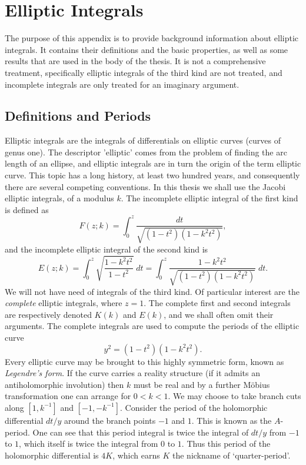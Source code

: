 
\section{Elliptic Integrals}
\label{sec:Elliptic Integrals}

The purpose of this appendix is to provide background information about elliptic integrals. It contains their definitions and the basic properties, as well as some results that are used in the body of the thesis. It is not a comprehensive treatment, specifically elliptic integrals of the third kind are not treated, and incomplete integrals are only treated for an imaginary argument.

\subsection{Definitions and Periods}
Elliptic integrals are the integrals of differentials on elliptic curves (curves of genus one). The descriptor 'elliptic' comes from the problem of finding the arc length of an ellipse, and elliptic integrals are in turn the origin of the term elliptic curve. This topic has a long history, at least two hundred years, and consequently there are several competing conventions. In this thesis we shall use the Jacobi elliptic integrals, of a modulus $k$. The incomplete elliptic integral of the first kind is defined as
\[
F(z;k) = \int_0^z \frac{dt}{\sqrt{(1-t^2)(1-k^2 t^2)}},
\]
and the incomplete elliptic integral of the second kind is
\[
E(z;k) = \int_0^z \sqrt{\frac{1-k^2 t^2}{1-t^2}} \;dt = \int_0^z \frac{1-k^2 t^2}{\sqrt{(1-t^2)(1-k^2 t^2)}}\;dt.
\]
We will not have need of integrals of the third kind. Of particular interest are the \emph{complete} elliptic integrals, where $z=1$. The complete first and second integrals are respectively denoted $K(k)$ and $E(k)$, and we shall often omit their arguments. The complete integrals are used to compute the periods of the elliptic curve
\[
y^2 = (1-t^2)(1-k^2 t^2).
\]
Every elliptic curve may be brought to this highly symmetric form, known as {\it Legendre's form}. If the curve carries a reality structure (if it admits an antiholomorphic involution) then $k$ must be real and by a further M\"obius transformation one can arrange for $0 < k < 1$. We may choose to take branch cuts along $[1,k^{-1}]$ and $[-1,-k^{-1}]$. Consider the period of the holomorphic differential $dt / y $ around the branch points $-1$ and $1$. This is known as the $A$-period. One can see that this period integral is twice the integral of $dt/ y$ from $-1$ to $1$, which itself is twice the integral from $0$ to $1$. Thus this period of the holomorphic differential is $4K$, which earns $K$ the nickname of `quarter-period'.

